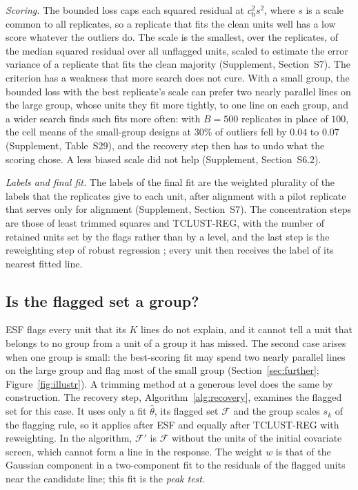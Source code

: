 \emph{Scoring.} The bounded loss caps each squared residual at $c_{\mathrm b}^{2}s^{2}$, where
$s$ is a scale common to all replicates, so a replicate that fits the clean units well has a low
score whatever the outliers do. The scale is the smallest, over the replicates, of the median
squared residual over all unflagged units, scaled to estimate the error variance of a
replicate that fits the clean majority (Supplement, Section~S7). The criterion has a weakness
that more search does not cure. With a small group, the
bounded loss with the best replicate's scale can prefer two nearly parallel lines on the large
group, whose units they fit more tightly, to one line on each group, and a wider search finds
such fits more often: with $B=500$ replicates in place of $100$, the cell means of the
small-group designs at $30\%$ of outliers fell by $0.04$ to $0.07$ (Supplement, Table~S29),
and the recovery step then has to undo what the scoring chose. A less biased scale did not
help (Supplement, Section~S6.2).

\emph{Labels and final fit.} The labels of the final fit are the weighted plurality of the
labels that the replicates give to each unit, after alignment with a pilot replicate that
serves only for alignment (Supplement, Section~S7). The concentration steps are those of least
trimmed squares \citep{rousseeuw2006computing} and TCLUST-REG, with the number of retained
units set by the flags rather than by a level, and the last step is the reweighting step of
robust regression \citep{rousseeuw1987robust,gervini2002class}; every unit then receives the
label of its nearest fitted line.

\subsection{Is the flagged set a group?}
\label{sec:recovery}

ESF flags every unit that its $K$ lines do not explain, and it cannot tell a unit that belongs
to no group from a unit of a group it has missed. The second case arises when one group is
small: the best-scoring fit may spend two nearly parallel lines on the large group and flag
most of the small group (Section~\ref{sec:further}; Figure~\ref{fig:illustr}). A trimming
method at a generous level does the same by construction. The recovery step,
Algorithm~\ref{alg:recovery}, examines the flagged set for this case. It uses only a fit
$\hat\theta$, its flagged set $\mathcal F$ and the group scales $s_k$ of the flagging rule, so
it applies after ESF and equally after TCLUST-REG with reweighting. In the
algorithm, $\mathcal F'$ is $\mathcal F$ without the units of the initial covariate screen,
which cannot form a line in the response. The weight $w$ is that of the Gaussian component in
a two-component fit to the residuals of the flagged units near the candidate line; this fit is
the \emph{peak test}.



